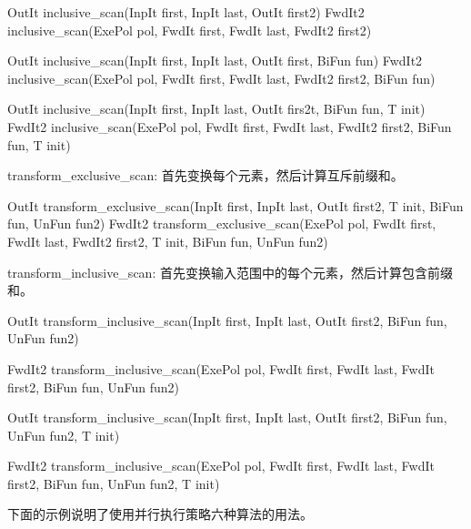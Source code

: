 \begin{cpp}
OutIt inclusive_scan(InpIt first, InpIt last, OutIt first2)
FwdIt2 inclusive_scan(ExePol pol, FwdIt first, FwdIt last, FwdIt2 first2)

OutIt inclusive_scan(InpIt first, InpIt last, OutIt first, BiFun fun)
FwdIt2 inclusive_scan(ExePol pol, FwdIt first, FwdIt last,
					  FwdIt2 first2, BiFun fun)

OutIt inclusive_scan(InpIt first, InpIt last, OutIt firs2t, BiFun fun, T init)
FwdIt2 inclusive_scan(ExePol pol, FwdIt first, FwdIt last,
					  FwdIt2 first2, BiFun fun, T init)
\end{cpp}

transform\_exclusive\_scan: 首先变换每个元素，然后计算互斥前缀和。

\begin{cpp}
OutIt transform_exclusive_scan(InpIt first, InpIt last, OutIt first2, T init, BiFun fun, UnFun fun2)
FwdIt2 transform_exclusive_scan(ExePol pol, FwdIt first, FwdIt last, FwdIt2 first2, T init, BiFun fun, UnFun fun2)
\end{cpp}

transform\_inclusive\_scan: 首先变换输入范围中的每个元素，然后计算包含前缀和。

\begin{cpp}
OutIt transform_inclusive_scan(InpIt first, InpIt last, OutIt first2,
							   BiFun fun, UnFun fun2)

FwdIt2 transform_inclusive_scan(ExePol pol, FwdIt first, FwdIt last,
								FwdIt first2,
								BiFun fun, UnFun fun2)

OutIt transform_inclusive_scan(InpIt first, InpIt last, OutIt first2,
							   BiFun fun, UnFun fun2,
							   T init)

FwdIt2 transform_inclusive_scan(ExePol pol, FwdIt first, FwdIt last,
								FwdIt first2,
								BiFun fun, UnFun fun2,
								T init)
\end{cpp}

下面的示例说明了使用并行执行策略六种算法的用法。


